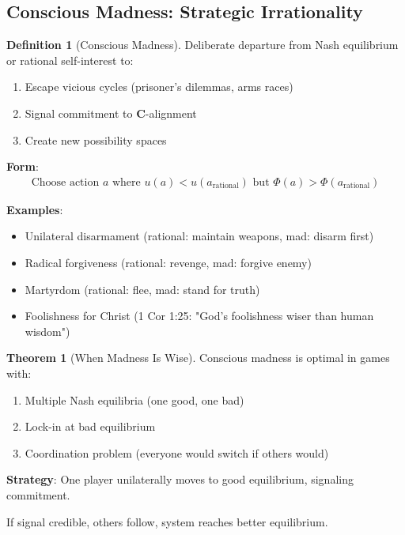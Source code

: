 \documentclass[11pt,a4paper]{article}
\theoremstyle{definition}
\newtheorem{definition}{Definition}[section]
\newtheorem{theorem}{Theorem}[section]
\theoremstyle{remark}
\begin{document}
\begin{enumerate}
\subsection{Conscious Madness: Strategic Irrationality}

\begin{definition}[Conscious Madness]
Deliberate departure from Nash equilibrium or rational self-interest to:
\begin{enumerate}
    \item Escape vicious cycles (prisoner's dilemmas, arms races)
    \item Signal commitment to \(\mathbf{C}\)-alignment
    \item Create new possibility spaces
\end{enumerate}

\textbf{Form}:
\begin{align}
\text{Choose action } a \text{ where } u(a) < u(a_{\text{rational}}) \text{ but } \Phi(a) > \Phi(a_{\text{rational}})
\end{align}

\textbf{Examples}:
\begin{itemize}
    \item Unilateral disarmament (rational: maintain weapons, mad: disarm first)
    \item Radical forgiveness (rational: revenge, mad: forgive enemy)
    \item Martyrdom (rational: flee, mad: stand for truth)
    \item Foolishness for Christ (1 Cor 1:25: "God's foolishness wiser than human wisdom")
\end{itemize}
\end{definition}

\begin{theorem}[When Madness Is Wise]
Conscious madness is optimal in games with:
\begin{enumerate}
    \item Multiple Nash equilibria (one good, one bad)
    \item Lock-in at bad equilibrium
    \item Coordination problem (everyone would switch if others would)
\end{enumerate}

\textbf{Strategy}: One player unilaterally moves to good equilibrium, signaling commitment.

If signal credible, others follow, system reaches better equilibrium.


\end{theorem}
\end{enumerate}
\end{document}

